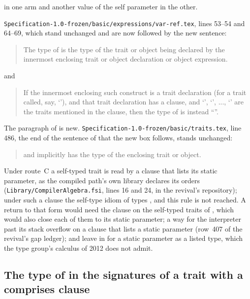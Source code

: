 \begin{description}
in one arm and another value of the self parameter in the other.
\item[Original text] \nolinkurl{Specification-1.0-frozen/basic/expressions/var-ref.tex},
lines 53--54 and 64--69, which stand unchanged and are now followed by the new
sentence:
\begin{quote}
The type of  is the type of the trait or object being declared by
the innermost enclosing trait or object declaration or object expression.
\end{quote}
and
\begin{quote}
If the innermost enclosing such construct is a trait declaration (for a trait
called, say, `'), and that trait declaration has a 
clause, and `', `', ..., `' are the traits mentioned
in the  clause, then the type of  is instead
``''.
\end{quote}
The paragraph of  is new.
\nolinkurl{Specification-1.0-frozen/basic/traits.tex}, line 486, the end of the
sentence of  that the new box follows, stands unchanged:
\begin{quote}
and implicitly has the type of the enclosing trait or object.
\end{quote}
\item[Route C] Under route~C a self-typed trait is read by a 
clause that lists its static parameter, as the compiled path's own library
declares its orders (\nolinkurl{Library/CompilerAlgebra.fsi}, lines 16 and 24,
in the revival's repository); under such a clause the self-type idiom of
 types , and this rule is not reached.
A return to that form would need the clause on the self-typed traits of
\library, which would also close each of them to its static parameter; a way
for the interpreter past its stack overflow on a clause that lists a static
parameter (row~407 of the revival's gap ledger); and leave in
 for a static parameter as a listed type, which the type
group's calculus of 2012 does not admit.
\end{description}

\subsection{The type of  in the signatures of a trait with a comprises clause}

